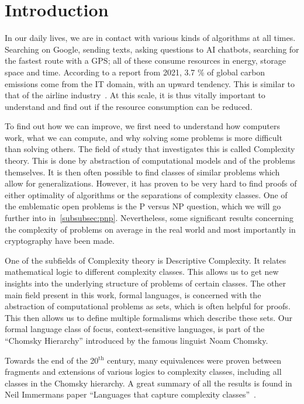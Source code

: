 \chapter{Introduction}\label{ch:intro}

In our daily lives, we are in contact with various kinds of algorithms at all times.
Searching on Google, sending texts, asking questions to AI chatbots, searching for the fastest route with a GPS; all of these consume resources in energy, storage space and time.
According to a report from 2021, 3.7 \% of global carbon emissions come from the IT domain, with an upward tendency.
This is similar to that of the airline industry~\cite{webFootprint}.
At this scale, it is thus vitally important to understand and find out if the resource consumption can be reduced.

To find out how we can improve, we first need to understand how computers work, what we can compute, and why solving some problems is more difficult than solving others.
The field of study that investigates this is called Complexity theory.
This is done by abstraction of computational models and of the problems themselves.
It is then often possible to find classes of similar problems which allow for generalizations.
However, it has proven to be very hard to find proofs of either optimality of algorithms or the separations of complexity classes.
One of the emblematic open problems is the P versus NP question, which we will go further into in~\cref{subsubsec:pnp}.
Nevertheless, some significant results concerning the complexity of problems on average in the real world and most importantly in cryptography have been made.

One of the subfields of Complexity theory is Descriptive Complexity.
It relates mathematical logic to different complexity classes.
This allows us to get new insights into the underlying structure of problems of certain classes.
The other main field present in this work, formal languages, is concerned with the abstraction of computational problems as sets, which is often helpful for proofs.
This then allows us to define multiple formalisms which describe these sets.
Our formal language class of focus, context-sensitive languages, is part of the ``Chomsky Hierarchy'' introduced by the famous linguist Noam Chomsky.

Towards the end of the 20$^{\text{th}}$ century, many equivalences were proven between fragments and extensions of various logics to complexity classes, including all classes in the Chomsky hierarchy.
A great summary of all the results is found in Neil Immermans paper ``Languages that capture complexity classes''~\cite{Immerman1987}.

